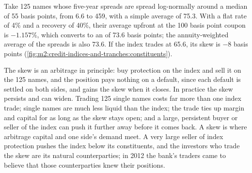 \begin{example}\label{ex:m2:credit-indices-and-tranches:intrinsic}
Take 125 names whose five-year spreads are spread log-normally around a median of 55
basis points, from 6.6 to 459, with a simple average of 75.3. With a flat rate of 4\%
and a recovery of 40\%, their average upfront at the 100 basis point coupon is
$-1.157\%$, which converts to an  of 73.6 basis points; the
annuity-weighted average of the spreads is also 73.6. If the index trades at 65.6, its
skew is $-8$ basis points (\cref{fig:m2:credit-indices-and-tranches:constituents}).
\end{example}

\begin{omfigure}

\label{fig:m2:credit-indices-and-tranches:constituents}
\end{omfigure}

The skew is an arbitrage in principle: buy protection on the index and sell it on the
125 names, and the position pays nothing on a default, since each default is settled
on both sides, and gains the skew when it closes. In practice the skew persists and
can widen. Trading 125 single names costs far more than one index trade; single names
are much less liquid than the index; the trade ties up margin and capital for as long
as the skew stays open; and a large, persistent buyer or seller of the index can push
it further away before it comes back. A skew is where arbitrage capital and one
side's demand meet. A very large seller of index protection pushes the index below its
constituents, and the investors who trade the skew are its natural counterparties; in
2012 the bank's traders came to believe that those counterparties knew their positions.

